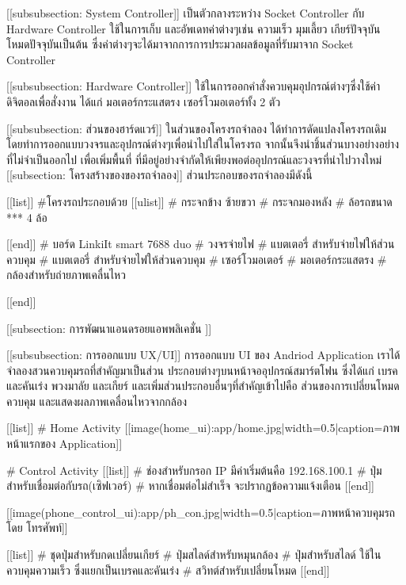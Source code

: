 		    [[subsubsection: System Controller]]
	   	    	เป็นตัวกลางระหว่าง Socket Controller กับ Hardware Controller ใช้ในการเก็บ และอัพเดทค่าต่างๆเช่น ความเร็ว มุมเลี้ยว เกียร์ปัจจุบัน โหมดปัจจุบันเป็นต้น ซึ่งค่าต่างๆจะได้มาจากการการประมวลผลข้อมูลที่รับมาจาก Socket Controller  

			[[subsubsection: Hardware Controller]]
	        	ใช้ในการออกคำสั่งควบคุมอุปกรณ์ต่างๆซึ่งใช้ค่าดิจิตอลเพื่อสั่งงาน ได้แก่ มอเตอร์กระแสตรง เซอร์โวมอเตอร์ทั้ง 2 ตัว

            
		[[subsubsection: ส่วนของฮาร์ดแวร์]]        
			ในส่วนของโครงรถจำลอง ได้ทำการดัดแปลงโครงรถเดิม โดยทำการออกแบบวงจรและอุปกรณ์ต่างๆเพื่อนำไปใส่ในโครงรถ จากนั้นจึงนำชิ้นส่วนบางอย่างอย่างที่ไม่จำเป็นออกไป เพื่อเพิ่มพื้นที่ ที่มีอยู่อย่างจำกัดให้เพียงพอต่ออุปกรณ์และวงจรที่นำไปวางใหม่
			[[subsection: โครงสร้างของของรถจำลอง]]
				ส่วนประกอบของรถจำลองมีดังนี้

				[[list]]
					#โครงรถประกอบด้วย
					[[ulist]]
						# กระจกข้าง ซ้ายขวา
						# กระจกมองหลัง
						# ล้อรถขนาด *** 4 ล้อ

					[[end]]
					# บอร์ด LinkiIt smart 7688 duo 
					# วงจรจ่ายไฟ
					# แบตเตอรี่ สำหรับจ่ายไฟให้ส่วนควบคุม
					# แบตเตอรี่ สำหรับจ่ายไฟให้ส่วนควบคุม
					# เซอร์โวมอเตอร์
					# มอเตอร์กระแสตรง
					# กล้องสำหรับถ่ายภาพเคลื่นไหว
			 
				[[end]]


	[[subsection: การพัฒนาแอนดรอยแอพพลิเคชั่น ]]

		[[subsubsection: การออกแบบ UX/UI]]
	        การออกแบบ UI ของ Andriod Application เราได้จำลองสวนควบคุมรถที่สำคัญมาเป็นส่วน	ประกอบต่างๆบนหน้าจออุปกรณ์สมาร์ตโฟน ซึ่งได้แก่ เบรคและคันเร่ง พวงมาลัย และเกียร์
	        และเพิ่มส่วนประกอบอื่นๆที่สำคัญเข้าไปคือ ส่วนของการเปลี่ยนโหมดควบคุม และแสดงผลภาพเคลื่อนไหวจากกล้อง

	        [[list]]
	        # Home Activity
	         	[[image(home_ui):app/home.jpg|width=0.5|caption=ภาพหน้าแรกของ Application]]

	     	# Control Activity
	 			[[list]]
	        	# ช่องสำหรับกรอก IP มีค่าเริ่มต้นคือ 192.168.100.1
				# ปุ่มสำหรับเชื่อมต่อกับรถ(เซิฟเวอร์)
				# หากเชื่อมต่อไม่สำเร็จ จะปรากฏข้อความแจ้งเตือน
				[[end]]

				[[image(phone_control_ui):app/ph_con.jpg|width=0.5|caption=ภาพหน้าควบคุมรถโดย โทรศัพท์]]

				[[list]]
					# ชุดปุ่มสำหรับกดเปลี่ยนเกียร์
					# ปุ่มสไลด์สำหรับหมุนกล้อง
					# ปุ่มสำหรับสไลด์ ใช้ในควบคุมความเร็ว ซึ่งแยกเป็นเบรคและคันเร่ง
					# สวิทต์สำหรับเปลี่ยนโหมด
				[[end]]

